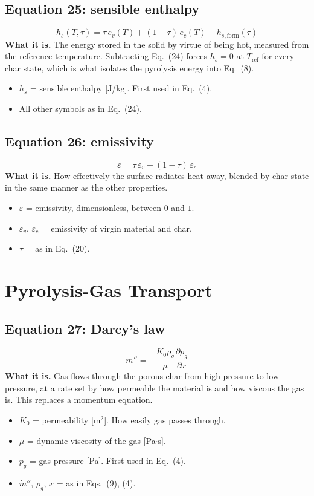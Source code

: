 \documentclass[11pt]{article}
\begin{document}
\subsection*{Equation 25: sensible enthalpy}
\begin{equation}
h_{s}(T,\tau) = \tau\, e_v(T) + (1-\tau)\, e_c(T) - h_{s,\mathrm{form}}(\tau)
\end{equation}
\textbf{What it is.} The energy stored in the solid by virtue of being hot,
measured from the reference temperature. Subtracting Eq.~(24) forces
$h_s = 0$ at $T_{\mathrm{ref}}$ for every char state, which is what isolates the
pyrolysis energy into Eq.~(8).
\begin{itemize}
  \item $h_s$ = sensible enthalpy [J/kg]. First used in Eq.~(4).
  \item All other symbols as in Eq.~(24).
\end{itemize}

\subsection*{Equation 26: emissivity}
\begin{equation}
\varepsilon = \tau\, \varepsilon_v + (1-\tau)\,\varepsilon_c
\end{equation}
\textbf{What it is.} How effectively the surface radiates heat away, blended by
char state in the same manner as the other properties.
\begin{itemize}
  \item $\varepsilon$ = emissivity, dimensionless, between $0$ and $1$.
  \item $\varepsilon_v$, $\varepsilon_c$ = emissivity of virgin material and char.
  \item $\tau$ = as in Eq.~(20).
\end{itemize}

\section{Pyrolysis-Gas Transport}

\subsection*{Equation 27: Darcy's law}
\begin{equation}
\dot m'' = -\frac{K_0 \rho_g}{\mu} \frac{\partial p_g}{\partial x}
\end{equation}
\textbf{What it is.} Gas flows through the porous char from high pressure to low
pressure, at a rate set by how permeable the material is and how viscous the gas
is. This replaces a momentum equation.
\begin{itemize}
  \item $K_0$ = permeability [m$^2$]. How easily gas passes through.
  \item $\mu$ = dynamic viscosity of the gas [Pa$\cdot$s].
  \item $p_g$ = gas pressure [Pa]. First used in Eq.~(4).
  \item $\dot m''$, $\rho_g$, $x$ = as in Eqs.~(9), (4).
\end{itemize}
\end{document}
